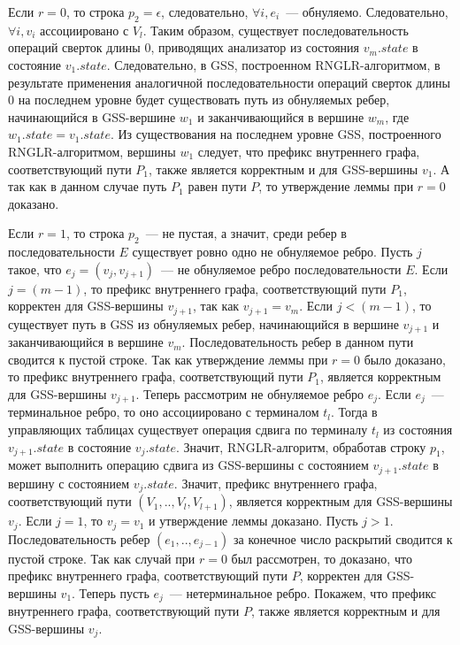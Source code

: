 Если $r = 0$, то строка $p_{2} = \epsilon$, следовательно, $\forall i, e_{i}$~--- обнуляемо. Следовательно, $\forall i, v_{i}$ ассоциировано с $V_{l}$. Таким образом, существует последовательность операций сверток длины 0, приводящих анализатор из состояния $v_{m}.state$ в состояние $v_{1}.state$. Следовательно, в GSS, построенном RNGLR-алгоритмом, в результате применения аналогичной последовательности операций сверток длины 0 на последнем уровне будет существовать путь из обнуляемых ребер, начинающийся в GSS-вершине $w_{1}$ и заканчивающийся в вершине $w_{m}$, где $w_{1}.state = v_{1}.state$. Из существования на последнем уровне GSS, построенного RNGLR-алгоритмом, вершины $w_{1}$ следует, что префикс внутреннего графа, соответствующий пути $P_{1}$, также является корректным и для GSS-вершины $v_{1}$. А так как в данном случае путь $P_{1}$ равен пути $P$, то утверждение леммы при $r = 0$ доказано.

Если $r = 1$, то строка $p_{2}$~--- не пустая, а значит, среди ребер в последовательности $E$ существует ровно одно не обнуляемое ребро. Пусть $j$ такое, что $e_{j} = (v_{j}, v_{j+1})$~--- не обнуляемое ребро последовательности $E$. Если $j = (m - 1)$, то префикс внутреннего графа, соответствующий пути $P_{1}$, корректен для GSS-вершины $v_{j+1}$, так как $v_{j+1} = v_{m}$. Если $j < (m - 1)$, то существует путь в GSS из обнуляемых ребер, начинающийся в вершине $v_{j+1}$ и заканчивающийся в вершине $v_{m}$. Последовательность ребер в данном пути сводится к пустой строке. Так как утверждение леммы при $r = 0$ было доказано, то префикс внутреннего графа, соответствующий пути $P_{1}$, является корректным для GSS-вершины $v_{j+1}$. Теперь рассмотрим не обнуляемое ребро $e_{j}$. Если $e_{j}$~--- терминальное ребро, то оно ассоциировано с терминалом $t_{l}$. Тогда в управляющих таблицах существует операция сдвига по терминалу $t_{l}$ из состояния $v_{j+1}.state$ в состояние $v_{j}.state$. Значит, RNGLR-алгоритм, обработав строку $p_{1}$, может выполнить операцию сдвига из GSS-вершины с состоянием $v_{j+1}.state$ в вершину с состоянием $v_{j}.state$. Значит, префикс внутреннего графа, соответствующий пути $(V_{1},..,V_{l},V_{l+1})$, является корректным для GSS-вершины $v_{j}$. Если $j = 1$, то $v_{j} = v_{1}$ и утверждение леммы доказано. Пусть $j > 1$. Последовательность ребер $(e_{1},..,e_{j-1})$ за конечное число раскрытий сводится к пустой строке. Так как случай при $r = 0$ был рассмотрен, то доказано, что префикс внутреннего графа, соответствующий пути $P$, корректен для GSS-вершины $v_{1}$. Теперь пусть $e_{j}$~--- нетерминальное ребро. Покажем, что префикс внутреннего графа, соответствующий пути $P$, также является корректным и для GSS-вершины $v_{j}$. 

